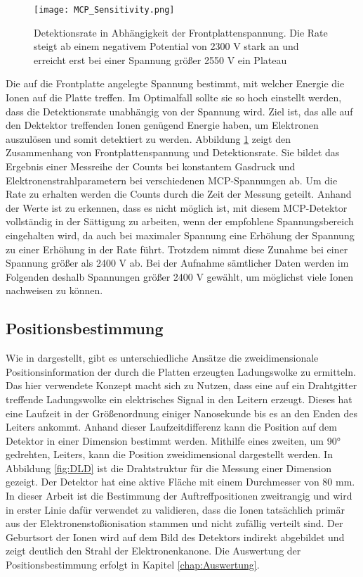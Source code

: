 \begin{figure}
    \centering
    \texttt{[image: MCP\_Sensitivity.png]}
    \caption[Detektionsrate in Abhängigkeit der Frontplattenspannung]{Detektionsrate in Abhängigkeit der Frontplattenspannung. Die Rate steigt ab einem negativem Potential von 2300 V stark an und erreicht erst bei einer Spannung größer 2550 V ein Plateau}
    \label{fig:Frontplattenspannung}
\end{figure}

Die auf die Frontplatte angelegte Spannung bestimmt, mit welcher Energie die Ionen auf die Platte treffen. Im Optimalfall sollte sie so hoch einstellt werden, dass die Detektionsrate unabhängig von der Spannung wird. Ziel ist, das alle auf den Dektektor treffenden Ionen genügend Energie haben, um Elektronen auszulösen und somit detektiert zu werden. Abbildung \ref{fig:Frontplattenspannung} zeigt den Zusammenhang von Frontplattenspannung und Detektionsrate. Sie bildet das Ergebnis einer Messreihe der Counts bei konstantem Gasdruck und Elektronenstrahlparametern bei verschiedenen MCP-Spannungen ab. Um die Rate zu erhalten werden die Counts durch die Zeit der Messung geteilt. Anhand der Werte ist zu erkennen, dass es nicht möglich ist, mit diesem MCP-Detektor vollständig in der Sättigung zu arbeiten, wenn der empfohlene Spannungsbereich eingehalten wird, da auch bei maximaler Spannung eine Erhöhung der Spannung zu einer Erhöhung in der Rate führt. Trotzdem nimmt diese Zunahme bei einer Spannung größer als 2400 V ab. Bei der Aufnahme sämtlicher Daten werden im Folgenden deshalb Spannungen größer 2400 V gewählt, um möglichst viele Ionen nachweisen zu können.

\subsection{Positionsbestimmung}
Wie in \cite{Detektorsystem} dargestellt, gibt es unterschiedliche Ansätze die zweidimensionale Positionsinformation der durch die Platten erzeugten Ladungswolke zu ermitteln. Das hier verwendete Konzept macht sich zu Nutzen, dass eine auf ein Drahtgitter treffende Ladungswolke ein elektrisches Signal in den Leitern erzeugt. Dieses hat eine Laufzeit in der Größenordnung einiger Nanosekunde bis es an den Enden des Leiters ankommt. Anhand dieser Laufzeitdifferenz kann die Position auf dem Detektor in einer Dimension bestimmt werden. Mithilfe eines zweiten, um \ang{90} gedrehten, Leiters, kann die Position zweidimensional dargestellt werden. In Abbildung \ref{fig:DLD} ist die Drahtstruktur für die Messung einer Dimension gezeigt. Der Detektor hat eine aktive Fläche mit einem Durchmesser von 80 mm. In dieser Arbeit ist die Bestimmung der Auftreffpositionen zweitrangig und wird in erster Linie dafür verwendet zu validieren, dass die Ionen tatsächlich primär aus der Elektronenstoßionisation stammen und nicht zufällig verteilt sind. Der Geburtsort der Ionen wird auf dem Bild des Detektors indirekt abgebildet und zeigt deutlich den Strahl der Elektronenkanone. Die Auswertung der Positionsbestimmung erfolgt in Kapitel \ref{chap:Auswertung}.

